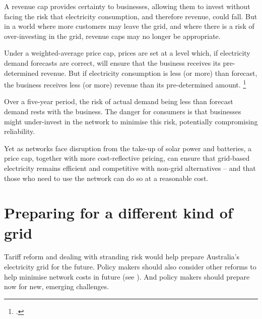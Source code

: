\documentclass[FrontPage]{grattan}
\begin{document}
A revenue cap provides certainty to businesses, allowing them to invest without facing the risk that electricity consumption, and therefore revenue, could fall. But in a world where more customers may leave the grid, and where there is a risk of over-investing in the grid, revenue caps may no longer be appropriate.

\CenturyFootnote

Under a weighted-average price cap, prices are set at a level which, if electricity demand forecasts are correct, will ensure that the business receives its pre-determined revenue. But if electricity consumption is less (or more) than forecast, the business receives less (or more) revenue than its pre-determined amount.%
\footcite[][199]{PC2013ElectricityInquiry}

Over a five-year period, the risk of actual demand being less than forecast demand rests with the business. The danger for consumers is that businesses might under-invest in the network to minimise this risk, potentially compromising reliability.

Yet as networks face disruption from the take-up of solar power and batteries, a price cap, together with more cost-reflective pricing, can ensure that grid-based electricity remains efficient and competitive with non-grid alternatives -- and that those who need to use the network can do so at a reasonable cost. 



\section{Preparing for a different kind of grid}
Tariff reform and dealing with stranding risk would help prepare Australia's electricity grid for the future. Policy makers should also consider other reforms to help minimise network costs in future (see ). And policy makers should prepare now for new, emerging challenges. 
\end{document}
